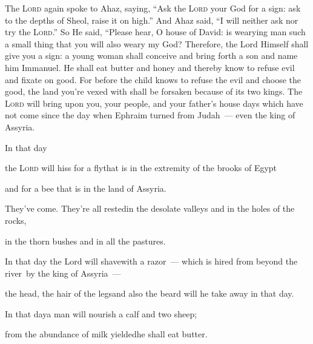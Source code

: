 \begin{inparaenum}
   The \textsc{Lord} again spoke to Ahaz, saying,%
   ``Ask the \textsc{Lord} your God for a sign: ask to the depths of Sheol, raise it on high.''%
   And Ahaz said, ``I will neither ask nor try the \textsc{Lord}.''%
   So He said, ``Please hear, O house of David: is wearying man such a small thing that you will also weary my God?%
   Therefore, the Lord Himself shall give you a sign: a young woman shall conceive and bring forth a son and name him Immanuel.%
   He shall eat butter and honey and thereby know to refuse evil and fixate on good.%
   For before the child knows to refuse the evil and choose the good, the land you're vexed with shall be forsaken because of its two kings.%
   The \textsc{Lord} will bring upon you, your people, and your father's house days which have not come since the day when Ephraim turned from Judah~--- even the king of Assyria.\smallskip%
  
  \pa {} In that day%
  
  \pb the \textsc{Lord} will hiss for a fly\pa that is in the extremity of the brooks of Egypt%
  
  \pb and for a bee that is in the land of Assyria.%
  
  \pa {} They've come. They're all rested\pa in the desolate valleys and in the holes of the rocks,%
  
  \pb in the thorn bushes and in all the pastures.%
  
  \pa {} In that day the Lord will shave\pa with a razor~--- which is hired from beyond the river\footnotemark\ by the king of Assyria~---%
  
  \pb the head, the hair of the legs\footnotemark\pa and also the beard will he take away in that day.%
  
  \pa {} In that day\pa a man will nourish a calf and two sheep;%
  
  \pa {} from the abundance of milk yielded\pa he shall eat butter.%
  

\end{inparaenum}
